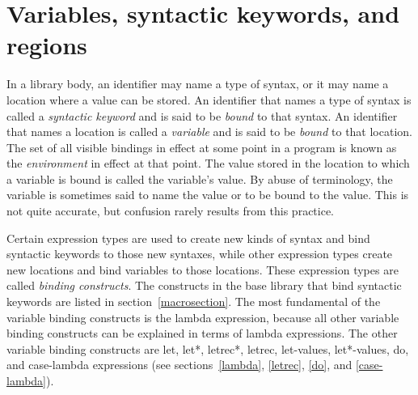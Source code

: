 \section{Variables, syntactic keywords, and regions}
\label{specialformsection}
\label{variablesection}

In a library body,
an identifier may name a type of syntax, or it may name
a location where a value can be stored.  An identifier that names a type
of syntax is called a {\em syntactic keyword}
and is said to be {\em bound} to that syntax.  An identifier that names a
location is called a {\em variable} and is said to be
{\em bound} to that location.  The set of all visible
bindings in effect at some point in a program is
known as the {\em environment} in effect at that point.  The value
stored in the location to which a variable is bound is called the
variable's value.  By abuse of terminology, the variable is sometimes
said to name the value or to be bound to the value.  This is not quite
accurate, but confusion rarely results from this practice.



\vest Certain expression types are used to create new kinds of syntax
and bind syntactic keywords to those new syntaxes, while other
expression types create new locations and bind variables to those
locations.  These expression types are called {\em binding constructs}.
The constructs in the base library that bind syntactic keywords are listed in section~\ref{macrosection}.
The most fundamental of the variable binding constructs is the
{\cf lambda} expression, because all other variable binding constructs
can be explained in terms of {\cf lambda} expressions.  The other
variable binding constructs are {\cf let}, {\cf let*}, {\cf letrec*},
{\cf letrec}, {\cf let-values}, {\cf let*-values}, {\cf do}, and {\cf
  case-lambda} expressions (see sections~\ref{lambda}, \ref{letrec}, 
\ref{do}, and \ref{case-lambda}).


